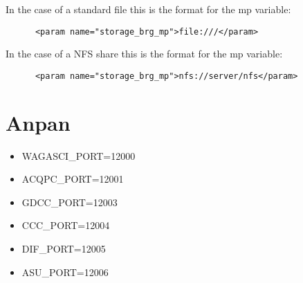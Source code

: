 In the case of a standard file this is the format for the mp variable:
\begin{lstlisting}
      <param name="storage_brg_mp">file:///</param>
\end{lstlisting}
In the case of a NFS share this is the format for the mp variable:
\begin{lstlisting}
      <param name="storage_brg_mp">nfs://server/nfs</param>
\end{lstlisting}

\section{Anpan}
\begin{itemize}
\item  WAGASCI\_PORT=12000
\item ACQPC\_PORT=12001
\item GDCC\_PORT=12003
\item CCC\_PORT=12004
\item DIF\_PORT=12005
\item ASU\_PORT=12006
\end{itemize}



